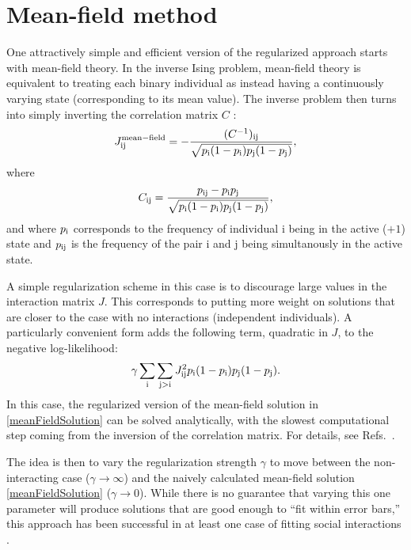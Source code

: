 \documentclass[aps,prl,twocolumn,nofootinbib]{revtex4-1}
\begin{document}
\section{Mean-field method}
One attractively simple and efficient version of the regularized approach starts
with mean-field theory.  In the inverse Ising problem, mean-field theory is equivalent
to treating each binary individual as instead having a continuously varying state
(corresponding to its mean value).  The inverse problem then turns into simply inverting
the correlation matrix $C$ \cite{CocMon12}:
\begin{equation}
\label{meanFieldSolution}
J^{\mathrm{mean-field}}_{\rm ij} =
    - \frac{ (C^{-1})_{\rm ij} }{ \sqrt{p_{\rm i}(1-p_{\rm i})p_{\rm j}(1-p_{\rm j})} },
\end{equation}
where
\begin{equation}
C_{\rm ij} = \frac{ p_{\rm ij} - p_{\rm i} p_{\rm j} }{ \sqrt{p_{\rm i}(1-p_{\rm i})p_{\rm j}(1-p_{\rm j})} },
\end{equation}
and where $p_{\rm i}$ corresponds to the frequency of individual i being
in the active ($+1$) state and $p_{\rm ij}$ is the frequency of the pair
i and j being simultanously in the active state.

A simple regularization scheme in this case is to discourage large values in the interaction
matrix $J$.  This corresponds to putting more weight on solutions that are closer to
the case with no interactions (independent individuals).  A particularly convenient form
adds the following term, quadratic in $J$, to the negative log-likelihood:
\begin{equation}
\gamma \sum_{\rm i} \sum_{\rm j > i} J_{\rm ij}^2 p_{\rm i} (1-p_{\rm i}) p_{\rm j} (1-p_{\rm j}).
\end{equation}
In this case, the regularized version of the mean-field solution in \eqref{meanFieldSolution}
can be solved analytically, with the slowest computational step coming from the inversion
of the correlation matrix.  For details, see Refs.~\cite{Daniels:1cq,BarCoc13}.

The idea is then to vary the regularization strength $\gamma$ to move between the
non-interacting case ($\gamma \rightarrow \infty$) and the naively calculated
mean-field solution \eqref{meanFieldSolution} ($\gamma \rightarrow 0$).
While there is no guarantee that varying this one parameter will produce solutions that are
good enough to ``fit within error bars,'' this approach has been successful in at least
one case of fitting social interactions \cite{DanKraFla17}.
\end{document}
